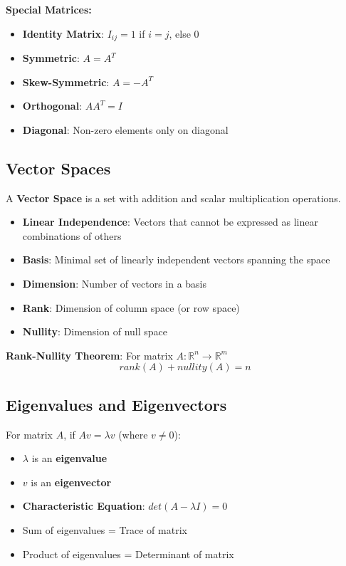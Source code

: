 \documentclass[12pt,a4paper]{report}
\begin{document}
\begin{concept}
\textbf{Special Matrices:}
\begin{itemize}
    \item \textbf{Identity Matrix}: $I_{ij} = 1$ if $i=j$, else 0
    \item \textbf{Symmetric}: $A = A^T$
    \item \textbf{Skew-Symmetric}: $A = -A^T$
    \item \textbf{Orthogonal}: $AA^T = I$
    \item \textbf{Diagonal}: Non-zero elements only on diagonal
\end{itemize}
\end{concept}

\subsection{Vector Spaces}
\begin{concept}
A \textbf{Vector Space} is a set with addition and scalar multiplication operations.
\begin{itemize}
    \item \textbf{Linear Independence}: Vectors that cannot be expressed as linear combinations of others
    \item \textbf{Basis}: Minimal set of linearly independent vectors spanning the space
    \item \textbf{Dimension}: Number of vectors in a basis
    \item \textbf{Rank}: Dimension of column space (or row space)
    \item \textbf{Nullity}: Dimension of null space
\end{itemize}
\end{concept}

\begin{theorem}
\textbf{Rank-Nullity Theorem}: For matrix $A: \mathbb{R}^n \to \mathbb{R}^m$
$$rank(A) + nullity(A) = n$$
\end{theorem}

\subsection{Eigenvalues and Eigenvectors}
\begin{concept}
For matrix $A$, if $Av = \lambda v$ (where $v \neq 0$):
\begin{itemize}
    \item $\lambda$ is an \textbf{eigenvalue}
    \item $v$ is an \textbf{eigenvector}
    \item \textbf{Characteristic Equation}: $det(A - \lambda I) = 0$
    \item Sum of eigenvalues = Trace of matrix
    \item Product of eigenvalues = Determinant of matrix
\end{itemize}
\end{concept}
\end{document}

